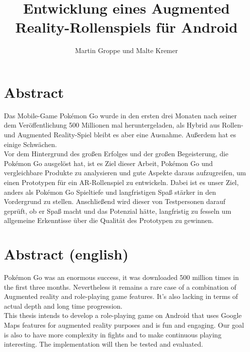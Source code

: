 \documentclass[extern,palatino]{cgBA}
\author{Martin Groppe und Malte Kremer}
\title{Entwicklung eines Augmented Reality-Rollenspiels für Android}
\begin{document}


\maketitle

\newpage

\tableofcontents
\clearpage         %
{}


\section{Abstract}

Das Mobile-Game Pokémon Go wurde in den ersten drei Monaten nach seiner dem Veröffentlichung 500 Millionen mal heruntergeladen, als Hybrid aus Rollen- und Augmented Reality-Spiel bleibt es aber eine Ausnahme. Außerdem hat es einige Schwächen.
\\Vor dem Hintergrund des großen Erfolges und der großen Begeisterung, die Pokémon Go ausgelöst hat, ist es Ziel dieser Arbeit, Pokémon Go und vergleichbare Produkte zu analysieren und gute Aspekte daraus aufzugreifen, um einen Prototypen für ein AR-Rollenspiel zu entwickeln. Dabei ist es unser Ziel, anders als Pokémon Go Spieltiefe und langfristigen Spaß stärker in den Vordergrund zu stellen.
Anschließend wird dieser von Testpersonen darauf geprüft, ob er Spaß macht und das Potenzial hätte, langfristig zu fesseln um allgemeine Erkenntisse über die Qualität des Prototypen zu gewinnen.
\section{Abstract (english)}
Pokémon Go was an enormous success, it was downloaded 500 million times in the first three months. Nevertheless it remains a rare case of a combination of Augmented reality and role-playing game features. It's also lacking in terms of actual depth and long time progression.
\\This thesis intends to develop a role-playing game on Android that uses Google Maps features for augmented reality purposes and is fun and engaging. Our goal is also to have more complexity in fights and to make continuous playing interesting. The implementation will then be tested and evaluated.
\newpage
\end{document}
